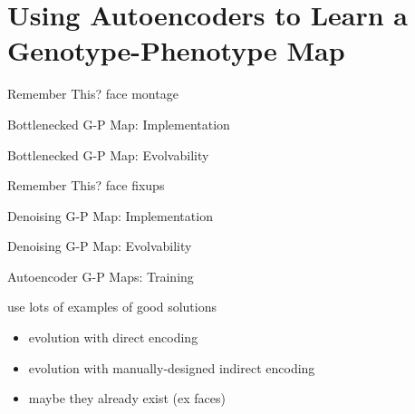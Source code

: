 \section{Using Autoencoders to Learn a Genotype-Phenotype Map}

\begin{frame}{Remember This?}
face montage
\end{frame}

\begin{frame}{Bottlenecked G-P Map: Implementation}



\end{frame}

\begin{frame}{Bottlenecked G-P Map: Evolvability}

\end{frame}

\begin{frame}{Remember This?}
face fixups
\end{frame}

\begin{frame}{Denoising G-P Map: Implementation}



\end{frame}

\begin{frame}{Denoising G-P Map: Evolvability}

\end{frame}

\begin{frame}{Autoencoder G-P Maps: Training}

use lots of examples of good solutions
\begin{itemize}
\item evolution with direct encoding
\item evolution with manually-designed indirect encoding
\item maybe they already exist (ex faces)
\end{itemize}

\end{frame}
